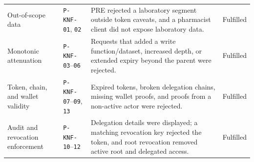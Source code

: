 \begin{table}[t]
\begin{tabular}{@{}p{}p{}p{}p{}@{}}
		Out-of-scope data                                                                                                                              &
		\texttt{P-KNF-01}, \texttt{02}                                                                                                                 &
		PRE rejected a laboratory segment outside token caveats, and a pharmacist client did not expose laboratory data.                               &
		Fulfilled                                                                                                                                                                                                                              \\
		Monotonic attenuation                                                                                                                          &
		\texttt{P-KNF-03}--\texttt{06}                                                                                                                 &
		Requests that added a write function/dataset, increased depth, or extended expiry beyond the parent were rejected.                             &
		Fulfilled                                                                                                                                                                                                                              \\
		Token, chain, and wallet validity                                                                                                              &
		\texttt{P-KNF-07}--\texttt{09}, \texttt{13}                                                                                                    &
		Expired tokens, broken delegation chains, missing wallet proofs, and proofs from a non-active actor were rejected.                             &
		Fulfilled                                                                                                                                                                                                                              \\
		Audit and revocation enforcement                                                                                                               &
		\texttt{P-KNF-10}--\texttt{12}                                                                                                                 &
		Delegation details were displayed; a matching revocation key rejected the token, and root revocation removed active root and delegated access. &
		Fulfilled                                                                                                                                                                                                                              \\

\end{tabular}
\end{table}
